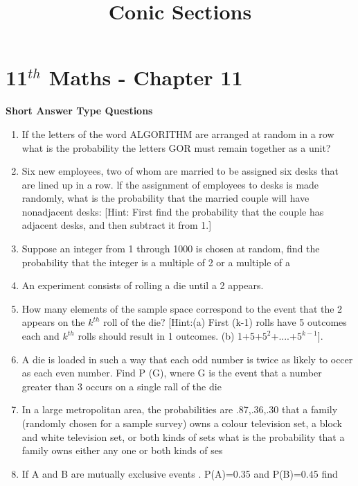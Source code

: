 \documentclass[12pt]{article}
\begin{document}
\begin{center}
\enlargethispage{-4cm}
\title{\textbf{Conic Sections}}
\date{\vspace{-5ex}} %
\maketitle
\end{center}
\setcounter{page}{1}
\section*{11$^{th}$ Maths - Chapter 11}
\textbf{Short Answer Type Questions}
\begin{enumerate}
\item If the letters of the word ALGORITHM are arranged at random in a row what is the probability the letters GOR must remain together as a unit?
\item Six new employees, two of whom are married to be assigned six desks that are lined up in a row. lf the assignment of employees to desks is made randomly, what is the probability that the married couple will have nonadjacent desks:
[Hint: First find the probability that the couple has adjacent desks, and then subtract it from 1.]
\item Suppose an integer from 1 through 1000 is chosen at random, find the probability that the integer is a multiple of 2 or a multiple of a
\item An experiment consists of rolling a die until a 2 appears.
\item How many elements of the sample space correspond to the event that the 2 appears on the $k^{th}$ roll of the die?
[Hint:(a) First (k-1) rolls have 5 outcomes each and $k^{th}$ rolls should result in 1 outcomes. (b) 1+5+$5^2$+....+$5^{k-1}$].
\item A die is loaded in such a way that each odd number is twice as likely to occer as each even number. Find P (G), wnere G is the event that a number greater than 3 occurs on a  single rall of the die
\item In a large metropolitan area, the probabilities are .87,.36,.30 that a family (randomly chosen for a sample survey) owns a colour television set, a block and white television set, or both kinds of sets what is the probability that a family owns either any one or both kinds of ses
\item  If A and B are mutually exclusive events . P(A)=0.35 and P(B)=0.45 find
\begin{enumerate}

\end{enumerate}
\end{enumerate}
\end{document}
